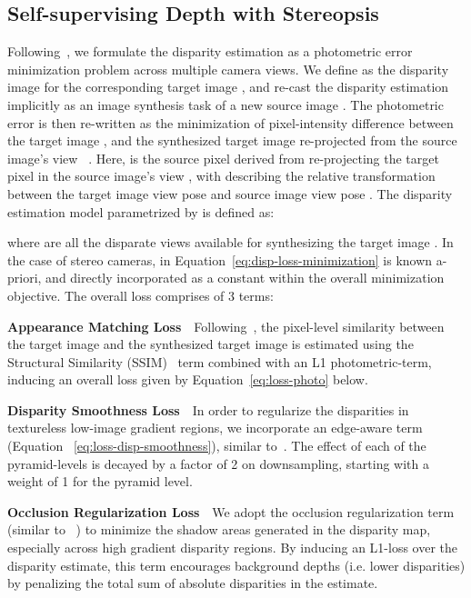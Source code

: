 \documentclass[letterpaper, 10 pt, conference]{ieeeconf}  \IEEEoverridecommandlockouts
\begin{document}
 \subsection{Self-supervising Depth with Stereopsis}  
\label{sec:proc-ssl-depth}
Following~\cite{godard2017unsupervised,garg2016unsupervised,zhou2017unsupervised}, we formulate the disparity estimation as a photometric error minimization problem across multiple camera views. We define  as the disparity image for the corresponding target image , and re-cast the disparity estimation implicitly as an image synthesis task of a new source image . The photometric error is then re-written as the minimization of pixel-intensity difference between the target image , and the synthesized target image re-projected from the source image's view ~\cite{jaderberg2015spatial}. Here,  is the source pixel derived from re-projecting the target pixel  in the source image's view , with  describing the relative transformation between the target image view pose  and source image view pose . The disparity estimation model  parametrized by  is defined as: 

where  are all the disparate views available for synthesizing the target image . In the case of stereo cameras,  in Equation~\ref{eq:disp-loss-minimization} is known a-priori, and directly incorporated as a constant within the overall minimization objective. The overall loss  comprises of 3 terms: 





\textbf{Appearance Matching Loss}~~Following~\cite{godard2017unsupervised}, the pixel-level similarity between the target image  and the synthesized target image  is estimated using the Structural Similarity (SSIM)~\cite{wang2004image} term combined with an L1 photometric-term, inducing an overall loss given by Equation~\ref{eq:loss-photo} below.   


\textbf{Disparity Smoothness Loss}~~In order to regularize the disparities in textureless low-image gradient regions, we incorporate an edge-aware term (Equation ~\ref{eq:loss-disp-smoothness}), similar to~\cite{godard2017unsupervised,yang2018deep,li2017undeepvo}. The effect of each of the pyramid-levels is decayed by a factor of 2 on downsampling, starting with a weight of 1 for the  pyramid level. 


\textbf{Occlusion Regularization Loss}~~We adopt the occlusion regularization term (similar to ~\cite{yang2018deep}) to minimize the shadow areas generated in the disparity map, especially across high gradient disparity regions. By inducing an L1-loss over the disparity estimate, this term encourages background depths (i.e. lower disparities) by penalizing the total sum of absolute disparities in the estimate. 
\end{document}
